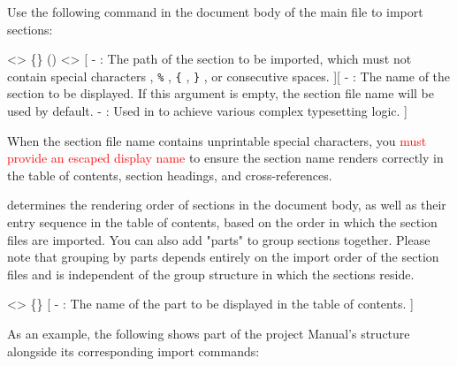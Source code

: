Use the following command in the document body of the main file to import sections:

<>{
    \{\}
    ()
    <>
}[
    -  : The path of the section to be imported, which must not contain special characters \texttt{\cs{}} , \texttt{\%} , \texttt{\{} , \texttt{\}} , or consecutive spaces.
][
    -  : The name of the section to be displayed. If this argument is empty, the section file name will be used by default.
    -  : Used in  to achieve various complex typesetting logic.
]

When the section file name contains unprintable special characters, you \textcolor{red}{must provide an escaped display name} to ensure the section name renders correctly in the table of contents, section headings, and cross-references.


\SimpleSystemTeX determines the rendering order of sections in the document body, as well as their entry sequence in the table of contents, based on the order in which the section files are imported. You can also add "parts" to group sections together. Please note that grouping by parts depends entirely on the import order of the section files and is independent of the group structure in which the sections reside.

<>{
    \{\}
}[
    -  : The name of the part to be displayed in the table of contents.
]

As an example, the following shows part of the project \SimpleSystemTeX Manual's structure alongside its corresponding import commands:


